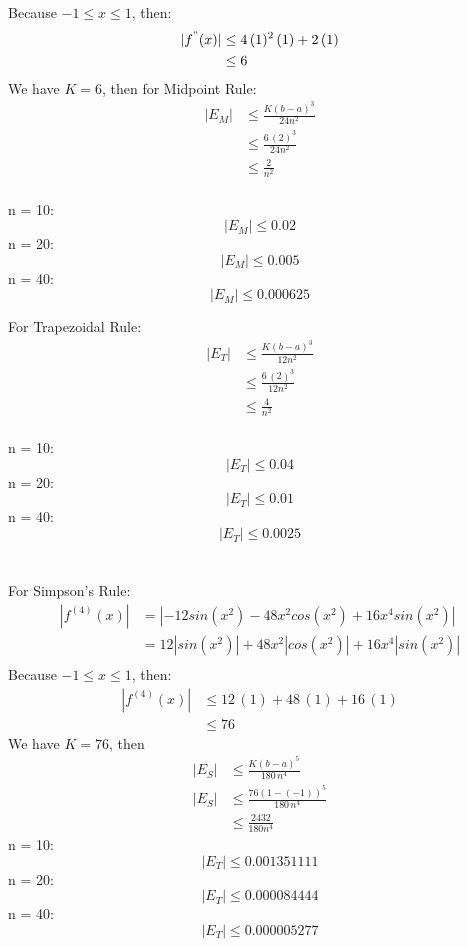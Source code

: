 \documentclass{article}
\begin{document}
    Because $-1 \leq x \leq 1$, then:
    \begin{align*}
        |f^{"}(x)| & \leq 4\,(1)^2\,(1) + 2\,(1) \\
        & \leq6
    \end{align*}
    We have $K = 6$, then for Midpoint Rule:
    \begin{align*}
        |E_{M}| &\leq \frac{K(b-a)^{3}}{24n^2} \\
        &\leq \frac{6\,(2)^3}{24n^2} \\
        &\leq \frac{2}{n^2}
    \end{align*} \\

    n = 10: \\
    $$ |E_{M}| \leq 0.02 $$
    n = 20: \\
    $$ |E_{M}| \leq 0.005 $$
    n = 40: \\
    $$ |E_{M}| \leq 0.000625 $$

    For Trapezoidal Rule:
    \begin{align*}
        |E_{T}| &\leq \frac{K(b-a)^{3}}{12n^2} \\
        &\leq \frac{6\,(2)^3}{12n^2} \\
        &\leq \frac{4}{n^2}
    \end{align*} \\

    n = 10: \\
    $$ |E_{T}| \leq 0.04 $$
    n = 20: \\
    $$ |E_{T}| \leq 0.01 $$
    n = 40: \\
    $$ |E_{T}| \leq 0.0025 $$ \\\\

    For Simpson's Rule:\\
    \begin{align*}
        |f^{(4)}(x)| &= |-12sin(x^2) - 48x^2cos(x^2) + 16x^4sin(x^2)| \\
        &= 12|sin(x^2)| + 48 x^2 |cos(x^2)| + 16 x^4 |sin(x^2)| \\
    \end{align*}
    Because $-1 \leq x \leq 1$, then:
    \begin{align*}
        |f^{(4)}(x)| & \leq 12\,(1) + 48\,(1) + 16\,(1) \\
        & \leq 76
    \end{align*}
    We have $ K = 76$, then
    \begin{align*}
        |E_{S}| & \leq \frac{K(b-a)^5}{180\,n^4} \\
        |E_{S}| & \leq \frac{76(1-(-1))^5}{180\,n^4} \\
        &\leq \frac{2432}{180n^4}
    \end{align*}
    n = 10: \\
    $$ |E_{T}| \leq 0.001351111 $$
    n = 20: \\
    $$ |E_{T}| \leq 0.000084444 $$
    n = 40: \\
    $$ |E_{T}| \leq 0.000005277 $$ \\\\
\end{document}
